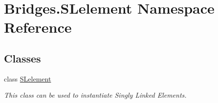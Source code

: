 \hypertarget{namespace_bridges_1_1_s_lelement}{}\section{Bridges.\+S\+Lelement Namespace Reference}
\label{namespace_bridges_1_1_s_lelement}
\subsection*{Classes}
\begin{DoxyCompactItemize}
\item 
class \hyperlink{class_bridges_1_1_s_lelement_1_1_s_lelement}{S\+Lelement}
\begin{DoxyCompactList}\small\item\em This class can be used to instantiate Singly Linked Elements. \end{DoxyCompactList}\end{DoxyCompactItemize}
